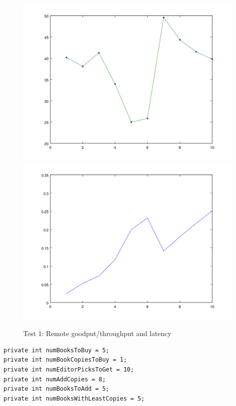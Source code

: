 \documentclass{article}      %
\begin{document}
\begin{figure}[ht]
\centering
 \includegraphics[scale=.33]{graphs/graph2-goodput}
 \includegraphics[scale=.33]{graphs/graph2-latency}
\caption{Test 1: Remote goodput/throughput and latency \label{overflow}}
\end{figure}

\begin{verbatim}
private int numBooksToBuy = 5;
private int numBookCopiesToBuy = 1;
private int numEditorPicksToGet = 10;
private int numAddCopies = 8;
private int numBooksToAdd = 5;
private int numBooksWithLeastCopies = 5;
\end{verbatim}
\end{document}
